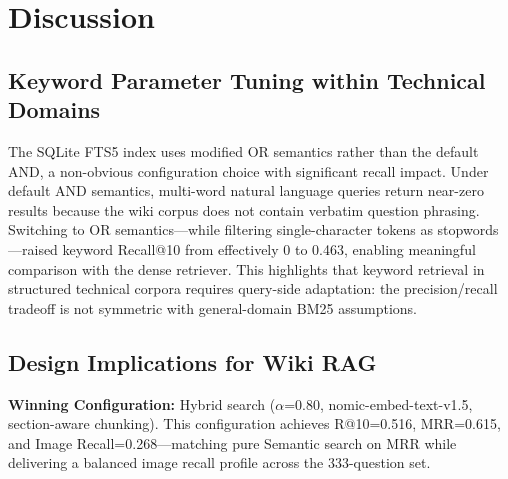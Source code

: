\documentclass[11pt,a4paper]{article}
\begin{document}
\section{Discussion}

\subsection{Keyword Parameter Tuning within Technical Domains}

The SQLite FTS5 index uses modified OR semantics rather than the default AND, a non-obvious configuration choice with significant recall impact. Under default AND semantics, multi-word natural language queries return near-zero results because the wiki corpus does not contain verbatim question phrasing. Switching to OR semantics---while filtering single-character tokens as stopwords---raised keyword Recall@10 from effectively 0 to 0.463, enabling meaningful comparison with the dense retriever. This highlights that keyword retrieval in structured technical corpora requires query-side adaptation: the precision/recall tradeoff is not symmetric with general-domain BM25 assumptions.

\subsection{Design Implications for Wiki RAG}
\textbf{Winning Configuration:} Hybrid search ($\alpha$=0.80, nomic-embed-text-v1.5, section-aware chunking). This configuration achieves R@10=0.516, MRR=0.615, and Image Recall=0.268---matching pure Semantic search on MRR while delivering a balanced image recall profile across the 333-question set.
\end{document}
